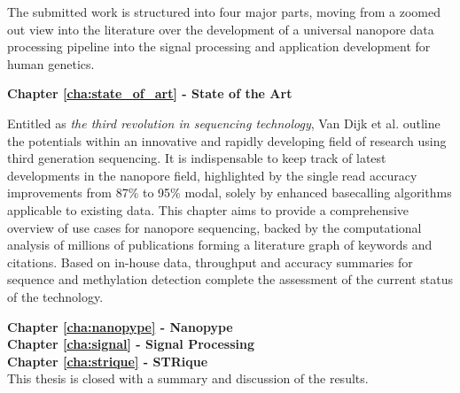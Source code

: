 The submitted work is structured into four major parts, moving from a zoomed out view into the literature over the development of a universal nanopore data processing pipeline into the signal processing and application development for human genetics.

\textbf{Chapter \ref{cha:state_of_art} - State of the Art} %

Entitled as \textit{the third revolution in sequencing technology}, Van Dijk et al. \cite{Dijk2018} outline the potentials within an innovative and rapidly developing field of research using third generation sequencing.
It is indispensable to keep track of latest developments in the nanopore field, highlighted by the single read accuracy improvements from 87\% to 95\% modal, solely by enhanced basecalling algorithms applicable to existing data.
This chapter aims to provide a comprehensive overview of use cases for nanopore sequencing, backed by the computational analysis of millions of publications forming a literature graph of keywords and citations.
Based on in-house data, throughput and accuracy summaries for sequence and methylation detection complete the assessment of the current status of the technology.


\textbf{Chapter \ref{cha:nanopype} - Nanopype} \\[0.2em]

\textbf{Chapter \ref{cha:signal} - Signal Processing} \\[0.2em]

\textbf{Chapter \ref{cha:strique} - STRique} \\[0.2em]

This thesis is closed with a summary and discussion of the results.







